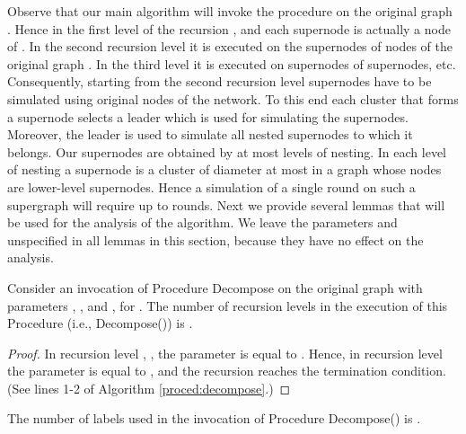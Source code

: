 \documentclass[11pt]{article}
\begin{document}
Observe that our main algorithm will invoke the procedure on the original graph . Hence in the first level of the recursion , and each supernode is actually a node of . In the second recursion level it is executed on the supernodes of nodes of the original graph . In the third level it is executed on supernodes of supernodes, etc. Consequently, starting from the second recursion level supernodes have to be simulated using original nodes of the network. To this end each cluster that forms a supernode selects a leader which is used for simulating the supernodes. Moreover, the leader is used to simulate all nested supernodes to which it belongs. Our supernodes are obtained by at most  levels of nesting. In each level of nesting a supernode is a cluster of diameter at most  in a graph whose nodes are lower-level supernodes. Hence a simulation of a single round on such a supergraph will require up to  rounds. 
Next we provide several lemmas that will be used for the analysis of the algorithm. We leave the parameters  and  unspecified in all lemmas in this section, because they have no effect on the analysis. \begin{lem} \label{decomposelevl}
Consider an invocation of Procedure Decompose on the original graph  with parameters , , and , for .
The number of recursion levels in the execution of this Procedure (i.e., Decompose()) is .
\end{lem}
\begin{proof}
In recursion level , , the parameter  is equal to . Hence, in recursion level  the parameter  is equal to , and the recursion reaches the termination condition. (See lines 1-2 of Algorithm \ref{proced:decompose}.)
\end{proof} 
\begin{lem} \label{numoflabels}
The number of labels used in the invocation of Procedure Decompose() is .
\end{lem}
\end{document}

